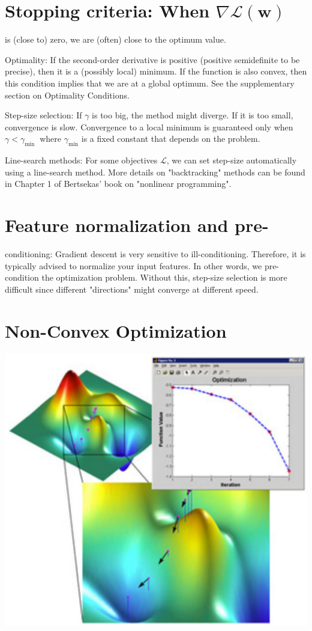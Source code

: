 \documentclass[10pt]{article}
\begin{document}
\section*{Stopping criteria: When $\nabla \mathcal{L}(\mathbf{w})$}
is (close to) zero, we are (often) close to the optimum value.

Optimality: If the second-order derivative is positive (positive semidefinite to be precise), then it is a (possibly local) minimum. If the function is also convex, then this condition implies that we are at a global optimum. See the supplementary section on Optimality Conditions.

Step-size selection: If $\gamma$ is too big, the method might diverge. If it is too small, convergence is slow. Convergence to a local minimum is guaranteed only when $\gamma<\gamma_{\text {min }}$ where $\gamma_{\min }$ is a fixed constant that depends on the problem.

Line-search methods: For some objectives $\mathcal{L}$, we can set step-size automatically using a line-search method. More details on "backtracking" methods can be found in Chapter 1 of Bertsekas' book on "nonlinear programming".

\section*{Feature normalization and pre-}
 conditioning: Gradient descent is very sensitive to ill-conditioning. Therefore, it is typically advised to normalize your input features. In other words, we pre-condition the optimization problem. Without this, step-size selection is more difficult since different "directions" might converge at different speed.\section*{Non-Convex Optimization}
\begin{center}
\includegraphics[max width=\textwidth]{2023_12_30_4ff132a3450066e65b4fg-21}
\end{center}
\end{document}
